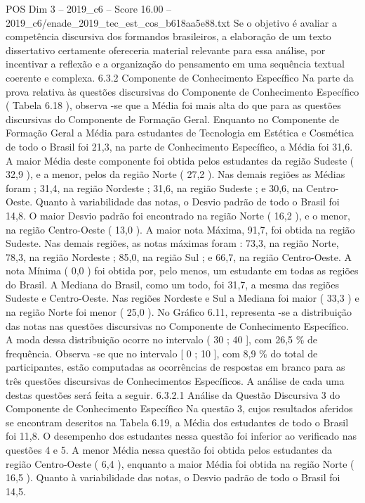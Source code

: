 \begin{textsample}{POS Dim 3 – 2019\_c6 – Score 16.00 – 2019\_c6/enade\_2019\_tec\_est\_cos\_b618aa5e88.txt}
Se o objetivo é avaliar a competência discursiva dos formandos brasileiros, a elaboração de um texto dissertativo certamente ofereceria material relevante para essa análise, por incentivar a reflexão e a organização do pensamento em uma sequência textual coerente e complexa. 6.3.2 Componente de Conhecimento Específico Na parte da prova relativa às questões discursivas do Componente de Conhecimento Específico ( Tabela 6.18 ), observa -se que a Média foi mais alta do que para as questões discursivas do Componente de Formação Geral.
Enquanto no Componente de Formação Geral a Média para estudantes de Tecnologia em Estética e Cosmética de todo o Brasil foi 21,3, na parte de Conhecimento Específico, a Média foi 31,6.
A maior Média deste componente foi obtida pelos estudantes da região Sudeste ( 32,9 ), e a menor, pelos da região Norte ( 27,2 ).
Nas demais regiões as Médias foram ; 31,4, na região Nordeste ; 31,6, na região Sudeste ; e 30,6, na Centro-Oeste.
Quanto à variabilidade das notas, o Desvio padrão de todo o Brasil foi 14,8.
O maior Desvio padrão foi encontrado na região Norte ( 16,2 ), e o menor, na região Centro-Oeste ( 13,0 ).
A maior nota Máxima, 91,7, foi obtida na região Sudeste.
Nas demais regiões, as notas máximas foram : 73,3, na região Norte, 78,3, na região Nordeste ; 85,0, na região Sul ; e 66,7, na região Centro-Oeste.
A nota Mínima ( 0,0 ) foi obtida por, pelo menos, um estudante em todas as regiões do Brasil.
A Mediana do Brasil, como um todo, foi 31,7, a mesma das regiões Sudeste e Centro-Oeste.
Nas regiões Nordeste e Sul a Mediana foi maior ( 33,3 ) e na região Norte foi menor ( 25,0 ).
No Gráfico 6.11, representa -se a distribuição das notas nas questões discursivas no Componente de Conhecimento Específico.
A moda dessa distribuição ocorre no intervalo ( 30 ; 40 ], com 26,5 \% de frequência.
Observa -se que no intervalo [ 0 ; 10 ], com 8,9 \% do total de participantes, estão computadas as ocorrências de respostas em branco para as três questões discursivas de Conhecimentos Específicos.
A análise de cada uma destas questões será feita a seguir. 6.3.2.1 Análise da Questão Discursiva 3 do Componente de Conhecimento Específico Na questão 3, cujos resultados aferidos se encontram descritos na Tabela 6.19, a Média dos estudantes de todo o Brasil foi 11,8.
O desempenho dos estudantes nessa questão foi inferior ao verificado nas questões 4 e 5.
A menor Média nessa questão foi obtida pelos estudantes da região Centro-Oeste ( 6,4 ), enquanto a maior Média foi obtida na região Norte ( 16,5 ).
Quanto à variabilidade das notas, o Desvio padrão de todo o Brasil foi 14,5.

\end{textsample}
